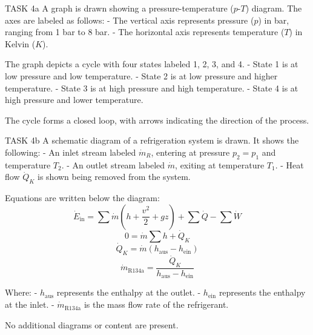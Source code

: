 TASK 4a  
A graph is drawn showing a pressure-temperature (\(p\)-\(T\)) diagram. The axes are labeled as follows:  
- The vertical axis represents pressure (\(p\)) in bar, ranging from 1 bar to 8 bar.  
- The horizontal axis represents temperature (\(T\)) in Kelvin (\(K\)).  

The graph depicts a cycle with four states labeled 1, 2, 3, and 4.  
- State 1 is at low pressure and low temperature.  
- State 2 is at low pressure and higher temperature.  
- State 3 is at high pressure and high temperature.  
- State 4 is at high pressure and lower temperature.  

The cycle forms a closed loop, with arrows indicating the direction of the process.  

TASK 4b  
A schematic diagram of a refrigeration system is drawn. It shows the following:  
- An inlet stream labeled \( \dot{m}_R \), entering at pressure \( p_2 = p_1 \) and temperature \( T_2 \).  
- An outlet stream labeled \( \dot{m} \), exiting at temperature \( T_1 \).  
- Heat flow \( \dot{Q}_K \) is shown being removed from the system.  

Equations are written below the diagram:  
\[
\dot{E}_{\text{in}} = \sum \dot{m} \left( h + \frac{v^2}{2} + gz \right) + \sum \dot{Q} - \sum \dot{W}
\]  
\[
0 = \dot{m} \sum h + \dot{Q}_K
\]  
\[
\dot{Q}_K = \dot{m} \left( h_{\text{aus}} - h_{\text{ein}} \right)
\]  
\[
\dot{m}_{\text{R134a}} = \frac{\dot{Q}_K}{h_{\text{aus}} - h_{\text{ein}}}
\]  

Where:  
- \( h_{\text{aus}} \) represents the enthalpy at the outlet.  
- \( h_{\text{ein}} \) represents the enthalpy at the inlet.  
- \( \dot{m}_{\text{R134a}} \) is the mass flow rate of the refrigerant.  

No additional diagrams or content are present.